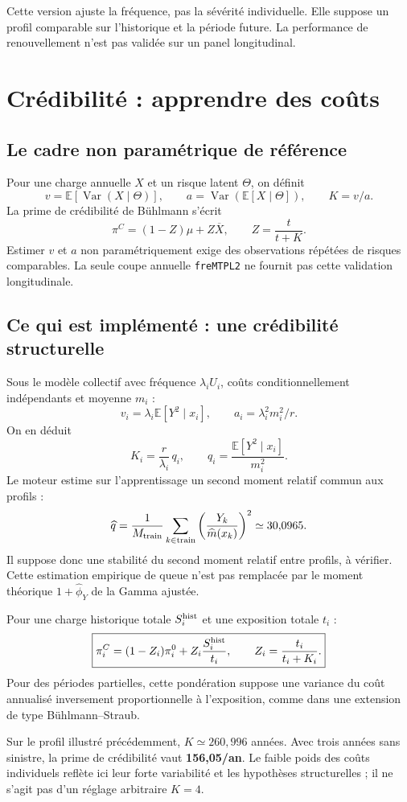 \documentclass[11pt,a4paper]{article}
\newcommand{\E}{\mathbb E}
\newcommand{\Var}{\operatorname{Var}}
\newcommand{\smallnote}[1]{{\small\color{Muted}#1}}
\begin{document}
\smallnote{Cette version ajuste la fréquence, pas la sévérité individuelle. Elle suppose un profil comparable sur l'historique et la période future. La performance de renouvellement n'est pas validée sur un panel longitudinal.}

\section{Crédibilité : apprendre des coûts}
\subsection*{Le cadre non paramétrique de référence}
Pour une charge annuelle $X$ et un risque latent $\Theta$, on définit
\[
v=\E[\Var(X\mid\Theta)],\qquad
 a=\Var(\E[X\mid\Theta]),\qquad K=v/a.
\]
La prime de crédibilité de Bühlmann s'écrit
\[
\pi^C=(1-Z)\mu+Z\overline X,\qquad Z=\frac t{t+K}.
\]
Estimer $v$ et $a$ non paramétriquement exige des observations répétées de risques comparables. La seule coupe annuelle \texttt{freMTPL2} ne fournit pas cette validation longitudinale.

\subsection*{Ce qui est implémenté : une crédibilité structurelle}
Sous le modèle collectif avec fréquence $\lambda_iU_i$, coûts conditionnellement indépendants et moyenne $m_i$ :
\[
v_i=\lambda_i\E[Y^2\mid x_i],\qquad
 a_i=\lambda_i^2m_i^2/r.
\]
On en déduit
\[
\boxed{K_i=\frac r{\lambda_i}\,q_i,\qquad
q_i=\frac{\E[Y^2\mid x_i]}{m_i^2}.}
\]
Le moteur estime sur l'apprentissage un second moment relatif commun aux profils :
\[
\widehat q=\frac1{M_{\rm train}}\sum_{k\in\mathrm{train}}
\left(\frac{Y_k}{\widehat m(x_k)}\right)^2\simeq30{,}0965.
\]
Il suppose donc une stabilité du second moment relatif entre profils, à vérifier. Cette estimation empirique de queue n'est pas remplacée par le moment théorique $1+\widehat\phi_Y$ de la Gamma ajustée.

Pour une charge historique totale $S_i^{\rm hist}$ et une exposition totale $t_i$ :
\[
\boxed{\pi_i^C=(1-Z_i)\pi_i^0+Z_i\frac{S_i^{\rm hist}}{t_i},\qquad
 Z_i=\frac{t_i}{t_i+K_i}.}
\]
Pour des périodes partielles, cette pondération suppose une variance du coût annualisé inversement proportionnelle à l'exposition, comme dans une extension de type Bühlmann--Straub.

\begin{keybox}
Sur le profil illustré précédemment, $K\simeq260{,}996$ années. Avec trois années sans sinistre, la prime de crédibilité vaut \textbf{156,05\texteuro{}/an}. Le faible poids des coûts individuels reflète ici leur forte variabilité et les hypothèses structurelles ; il ne s'agit pas d'un réglage arbitraire $K=4$.
\end{keybox}
\end{document}
